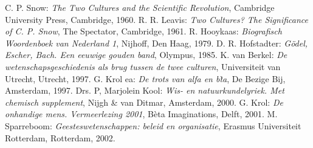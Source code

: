 \begin{thebibliography}{10}

C. P. Snow: \emph{The Two Cultures and the Scientific Revolution}, Cambridge University Press, Cambridge, 1960.
R. R. Leavis: \emph{Two Cultures? The Significance of C. P. Snow}, The Spectator, Cambridge, 1961.
R. Hooykaas: \emph{Biografisch Woordenboek van Nederland 1}, Nijhoff, Den Haag, 1979.
D. R. Hofstadter: \emph{G\"odel, Escher, Bach. Een eeuwige gouden band}, Olympus, 1985.
K. van Berkel: \emph{De wetenschapsgeschiedenis als brug tussen de twee culturen}, Universiteit van Utrecht, Utrecht, 1997.
G. Krol ea: \emph{De trots van alfa en b\`ta}, De Bezige Bij, Amsterdam, 1997.
Drs. P, Marjolein Kool: \emph{Wis- en natuurkundelyriek. Met chemisch supplement}, Nijgh \& van Ditmar, Amsterdam, 2000.
G. Krol: \emph{De onhandige mens. Vermeerlezing 2001}, B\`eta Imaginations, Delft, 2001.
M. Sparreboom: \emph{Geesteswetenschappen: beleid en organisatie}, Erasmus Universiteit Rotterdam, Rotterdam, 2002.

\end{thebibliography}